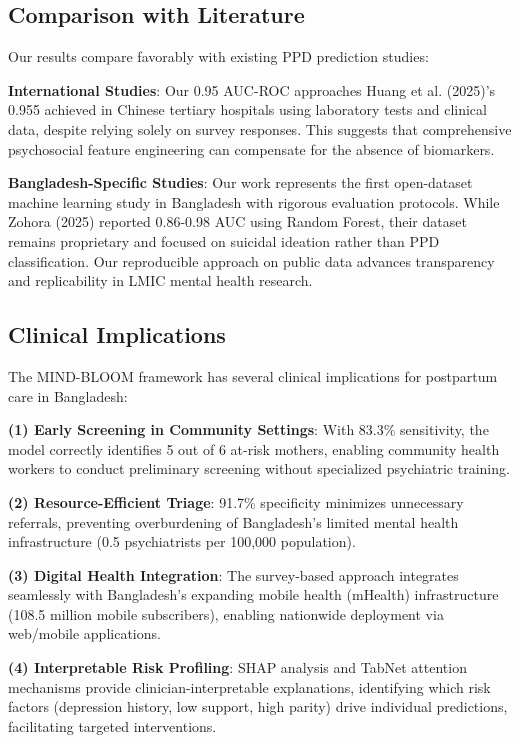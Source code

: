 \subsection{Comparison with Literature}

Our results compare favorably with existing PPD prediction studies:

\textbf{International Studies}: Our 0.95 AUC-ROC approaches Huang et al. (2025)'s 0.955 achieved in Chinese tertiary hospitals using laboratory tests and clinical data, despite relying solely on survey responses. This suggests that comprehensive psychosocial feature engineering can compensate for the absence of biomarkers.

\textbf{Bangladesh-Specific Studies}: Our work represents the first open-dataset machine learning study in Bangladesh with rigorous evaluation protocols. While Zohora (2025) reported 0.86-0.98 AUC using Random Forest, their dataset remains proprietary and focused on suicidal ideation rather than PPD classification. Our reproducible approach on public data advances transparency and replicability in LMIC mental health research.

\subsection{Clinical Implications}

The MIND-BLOOM framework has several clinical implications for postpartum care in Bangladesh:

\textbf{(1) Early Screening in Community Settings}: With 83.3\% sensitivity, the model correctly identifies 5 out of 6 at-risk mothers, enabling community health workers to conduct preliminary screening without specialized psychiatric training.

\textbf{(2) Resource-Efficient Triage}: 91.7\% specificity minimizes unnecessary referrals, preventing overburdening of Bangladesh's limited mental health infrastructure (0.5 psychiatrists per 100,000 population).

\textbf{(3) Digital Health Integration}: The survey-based approach integrates seamlessly with Bangladesh's expanding mobile health (mHealth) infrastructure (108.5 million mobile subscribers), enabling nationwide deployment via web/mobile applications.

\textbf{(4) Interpretable Risk Profiling}: SHAP analysis and TabNet attention mechanisms provide clinician-interpretable explanations, identifying which risk factors (depression history, low support, high parity) drive individual predictions, facilitating targeted interventions.

